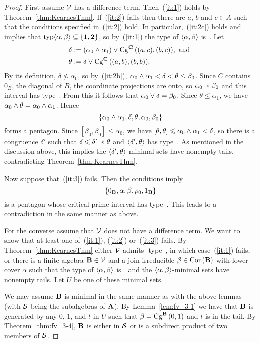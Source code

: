 \documentclass{ws-ijac}
\begin{document}
\begin{proof}
First assume $\sV$ has a difference term.
Then~(\ref{it:1}) holds by Theorem~\ref{thm:KearnesThm}.
If~(\ref{it:2}) fails then there are $a$, $b$ and $c\in A$ such
that the conditions specified in~(\ref{it:2}) hold.
In particular,~(\ref{it:2c}) holds and implies that
$\typ\<\alpha, \beta\> \subseteq \{\utyp, \atyp\}$,
so by~(\ref{it:1}) the type of $\<\alpha, \beta\>$ is~\atyp.
Let
\begin{align*}
\delta &:= (\alpha_0 \meet \alpha_1) \join \Cga {(a,c)} {(b,c)} C,
            \text{ and }\\
\theta &:= \delta \join \Cga {(a,b)}{(b,b)} C.
\end{align*}
By its definition, $\delta \nleq \alpha_0$,
so by~(\ref{it:2b}), $\alpha_0\meet\alpha_1 < \delta < \theta \le \beta_0$.
Since $C$ contains $0_B$, the diagonal of $B$, the coordinate
projections are onto, so $\alpha_0 \cov \beta_0$ and this interval
has type~\atyp.
From this it follows that $\alpha_0 \join \delta = \beta_0$.
Since $\theta \le \alpha_1$, we have $\alpha_0 \meet \theta = \alpha_0\meet\alpha_1$.
Hence
\[
\{\alpha_0\meet\alpha_1, \delta, \theta, \alpha_0, \beta_0 \}
\]
forms a pentagon.
Since $[\beta_0,\beta_0] \leq \alpha_0$, we have
$[\theta,\theta] \leq \alpha_0\meet\alpha_1 < \delta$,
so there is a congruence $\delta'$ such that
$\delta\leq \delta' \cov \theta$ and $\<\delta', \theta\>$
has type~\atyp.
As mentioned in the discussion above, this implies the
$\la \delta',\theta\ra$-minimal sets have nonempty tails, contradicting
Theorem~\ref{thm:KearnesThm}.

Now suppose that~(\ref{it:3}) fails. Then the conditions imply
\[
\{0_{\alg B}, \alpha, \beta, \rho_0, 1_{\alg B} \}
\]
is a pentagon whose critical prime interval has type~\atyp. This
leads to a contradiction in the same manner as above.

For the converse assume that $\sV$ does not have a difference
term.
We want to show that at least one of~(\ref{it:1}), (\ref{it:2}) or~(\ref{it:3}) fails.
By Theorem~\ref{thm:KearnesThm} either $\sV$ admits \tct-type~\utyp, in which case~(\ref{it:1}) fails, or there is a finite
algebra $\alg B \in \sV$ and a join irreducible
$\beta \in \op{Con}(\alg B)$ with lower cover
$\alpha$ such that the type of $\<\alpha, \beta\>$ is~\atyp\
and the $\la\alpha,\beta\ra$-minimal sets have
nonempty tails. Let $U$ be one of these minimal sets.


We may assume $\alg B$ is minimal in the same manner as with the
above lemmas (with $\sS$ being the subalgebras of $\alg A$).
By Lemma~\ref{lem:fv_3-1}
we have that $\alg B$ is generated by any $0$, $1$, and $t$ in
$U$ such
that $\beta = \Cga 01{B}$ and $t$ is in the tail. By
Theorem~\ref{thm:fv_3-4}, $\alg B$ is either
in $\sS$ or is a subdirect product of two members of $\sS$.


\end{proof}
\end{document}
